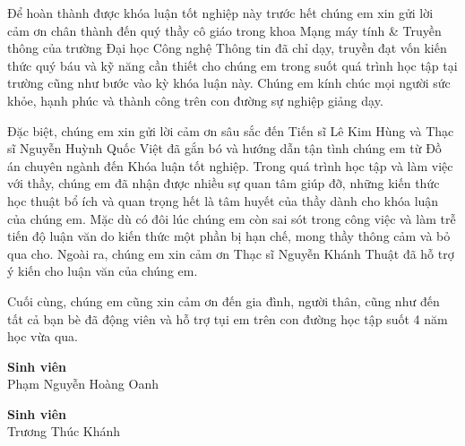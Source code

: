 

Để hoàn thành được khóa luận tốt nghiệp này trước hết chúng em xin gửi lời cảm ơn chân thành đến quý thầy cô giáo trong khoa Mạng máy tính \& Truyền thông của trường Đại học Công nghệ Thông tin đã chỉ dạy, truyền đạt vốn kiến thức quý báu và kỹ năng cần thiết cho chúng em trong suốt quá trình học tập tại trường cũng như bước vào kỳ khóa luận này. Chúng em kính chúc mọi người sức khỏe, hạnh phúc và thành công trên con đường sự nghiệp giảng dạy. 

Đặc biệt, chúng em xin gửi lời cảm ơn sâu sắc đến Tiến sĩ Lê Kim Hùng và Thạc sĩ Nguyễn Huỳnh Quốc Việt đã gắn bó và hướng dẫn tận tình chúng em từ Đồ án chuyên ngành đến Khóa luận tốt nghiệp. Trong quá trình học tập và làm việc với thầy, chúng em đã nhận được nhiều sự quan tâm giúp đỡ, những kiến thức học thuật bổ ích và quan trọng hết là tâm huyết của thầy dành cho khóa luận của chúng em. Mặc dù có đôi lúc chúng em còn sai sót trong công việc và làm trễ tiến độ luận văn do kiến thức một phần bị hạn chế, mong thầy thông cảm và bỏ qua cho. Ngoài ra, chúng em xin cảm ơn Thạc sĩ Nguyễn Khánh Thuật đã hỗ trợ ý kiến cho luận văn của chúng em.

Cuối cùng, chúng em cũng xin cảm ơn đến gia đình, người thân, cũng như đến tất cả bạn bè đã động viên và hỗ trợ tụi em trên con đường học tập suốt 4 năm học vừa qua. 

\hfill

\begin{minipage}{2in}
    \textbf{Sinh viên} \\
    Phạm Nguyễn Hoàng Oanh
    \end{minipage}
    \hfill
    \begin{minipage}{2in}
    \textbf{Sinh viên} \\
    Trương Thúc Khánh
\end{minipage}
